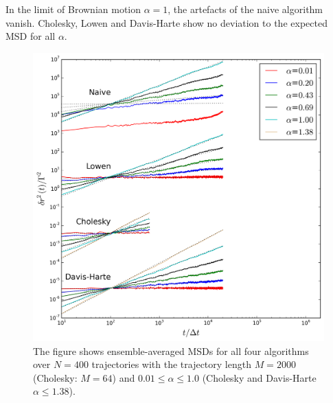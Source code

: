 \documentclass[
  a4paper,BCOR10mm,oneside,
  headsepline,footsepline,%
  fleqn,openbib
]{scrbook}
\begin{document}
In the limit of Brownian motion $\alpha=1$, the artefacts of the naive algorithm  vanish. Cholesky, Lowen and Davis-Harte show no deviation to the expected MSD for all $\alpha$. \par
\begin{figure}[h!]
\centering
\includegraphics[width=\textwidth]{./data/alpha_changethreeneu.png}
\caption{The figure shows ensemble-averaged MSDs for all four algorithms over $N=400$ trajectories with the trajectory length $M=2000$ (Cholesky: $M=64$) and $0.01\leq\alpha\leq1.0$ (Cholesky and Davis-Harte $\alpha\leq1.38$).}
\label{alphachange}
\end{figure}
\end{document}
